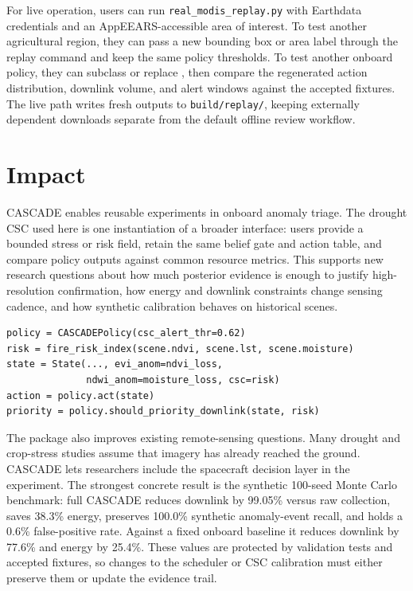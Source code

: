 \documentclass[preprint,12pt,a4paper]{elsarticle}
\begin{document}
For live operation, users can run \texttt{real\_modis\_replay.py} with Earthdata credentials and an AppEEARS-accessible area of interest. To test another agricultural region, they can pass a new bounding box or area label through the replay command and keep the same policy thresholds. To test another onboard policy, they can subclass or replace , then compare the regenerated action distribution, downlink volume, and alert windows against the accepted fixtures. The live path writes fresh outputs to \texttt{build/replay/}, keeping externally dependent downloads separate from the default offline review workflow.

\section{Impact}

CASCADE enables reusable experiments in onboard anomaly triage. The drought CSC used here is one instantiation of a broader interface: users provide a bounded stress or risk field, retain the same belief gate and action table, and compare policy outputs against common resource metrics. This supports new research questions about how much posterior evidence is enough to justify high-resolution confirmation, how energy and downlink constraints change sensing cadence, and how synthetic calibration behaves on historical scenes.

\begin{verbatim}
policy = CASCADEPolicy(csc_alert_thr=0.62)
risk = fire_risk_index(scene.ndvi, scene.lst, scene.moisture)
state = State(..., evi_anom=ndvi_loss,
              ndwi_anom=moisture_loss, csc=risk)
action = policy.act(state)
priority = policy.should_priority_downlink(state, risk)
\end{verbatim}

The package also improves existing remote-sensing questions. Many drought and crop-stress studies assume that imagery has already reached the ground. CASCADE lets researchers include the spacecraft decision layer in the experiment. The strongest concrete result is the synthetic 100-seed Monte Carlo benchmark: full CASCADE reduces downlink by 99.05\% versus raw collection, saves 38.3\% energy, preserves 100.0\% synthetic anomaly-event recall, and holds a 0.6\% false-positive rate. Against a fixed onboard baseline it reduces downlink by 77.6\% and energy by 25.4\%. These values are protected by validation tests and accepted fixtures, so changes to the scheduler or CSC calibration must either preserve them or update the evidence trail.
\end{document}
